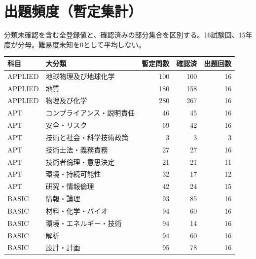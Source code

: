 \chapter{出題頻度（暫定集計）}
分類未確認を含む全登録値と、確認済みの部分集合を区別する。16試験回、15年度が分母。難易度未知を0として平均しない。
\begin{longtable}{p{.16\linewidth}p{.42\linewidth}rrr}
科目 & 大分類 & 暫定問数 & 確認済 & 出題回数\\\hline
APPLIED & 地球物理及び地球化学 & 100 & 100 & 16\\
APPLIED & 地質 & 180 & 158 & 16\\
APPLIED & 物理及び化学 & 280 & 267 & 16\\
APT & コンプライアンス・説明責任 & 46 & 45 & 16\\
APT & 安全・リスク & 69 & 42 & 16\\
APT & 技術と社会・科学技術政策 & 3 & 3 & 3\\
APT & 技術士法・義務責務 & 27 & 27 & 16\\
APT & 技術者倫理・意思決定 & 21 & 21 & 11\\
APT & 環境・持続可能性 & 32 & 17 & 12\\
APT & 研究・情報倫理 & 42 & 24 & 15\\
BASIC & 情報・論理 & 93 & 85 & 16\\
BASIC & 材料・化学・バイオ & 94 & 60 & 16\\
BASIC & 環境・エネルギー・技術 & 94 & 14 & 16\\
BASIC & 解析 & 94 & 60 & 16\\
BASIC & 設計・計画 & 95 & 78 & 16\\
\end{longtable}
